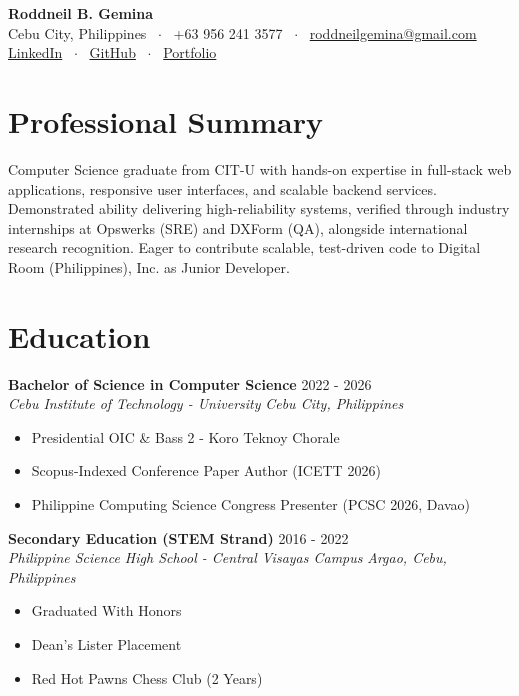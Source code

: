 \documentclass[letterpaper,10pt]{article}
\begin{document}
\begin{center}
    {\LARGE \textbf{Roddneil B. Gemina}} \\ \vspace{2pt}
    \small Cebu City, Philippines \ $\cdot$ \ +63 956 241 3577 \ $\cdot$ \ \href{mailto:roddneilgemina@gmail.com}{roddneilgemina@gmail.com} \\ \vspace{2pt}
    \href{https://www.linkedin.com/in/roddneil-gemina-20b423409}{LinkedIn} \ $\cdot$ \ \href{https://github.com/RoddneilGemina}{GitHub} \ $\cdot$ \ \href{https://roddneilgemina.github.io}{Portfolio}
\end{center}

\vspace{-4pt}
\section{Professional Summary}
Computer Science graduate from CIT-U with hands-on expertise in full-stack web applications, responsive user interfaces, and scalable backend services. Demonstrated ability delivering high-reliability systems, verified through industry internships at Opswerks (SRE) and DXForm (QA), alongside international research recognition. Eager to contribute scalable, test-driven code to Digital Room (Philippines), Inc. as Junior Developer.

\section{Education}
\textbf{Bachelor of Science in Computer Science} \hfill 2022 - 2026
\\ \textit{Cebu Institute of Technology - University} \hfill \textit{Cebu City, Philippines}
\begin{itemize}
  \item Presidential OIC \& Bass 2 - Koro Teknoy Chorale
  \item Scopus-Indexed Conference Paper Author (ICETT 2026)
  \item Philippine Computing Science Congress Presenter (PCSC 2026, Davao)
\end{itemize}
\vspace{4pt}
\textbf{Secondary Education (STEM Strand)} \hfill 2016 - 2022
\\ \textit{Philippine Science High School - Central Visayas Campus} \hfill \textit{Argao, Cebu, Philippines}
\begin{itemize}
  \item Graduated With Honors
  \item Dean's Lister Placement
  \item Red Hot Pawns Chess Club (2 Years)
\end{itemize}
\vspace{4pt}
\end{document}
